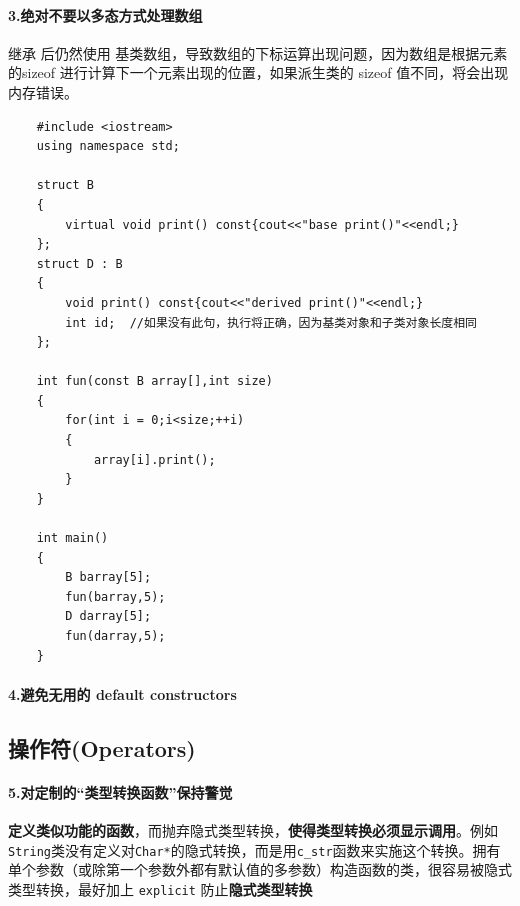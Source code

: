 \documentclass[UTF8,a4paper,12pt]{ctexbook}
\begin{document}
			\paragraph{3.绝对不要以多态方式处理数组} 继承 后仍然使用 基类数组，导致数组的下标运算出现问题，因为数组是根据元素的sizeof 进行计算下一个元素出现的位置，如果派生类的 sizeof 值不同，将会出现内存错误。
				\begin{lstlisting}
	#include <iostream>
	using namespace std;
	
	struct B
	{
		virtual void print() const{cout<<"base print()"<<endl;}
	};
	struct D : B
	{
		void print() const{cout<<"derived print()"<<endl;}
		int id;  //如果没有此句，执行将正确，因为基类对象和子类对象长度相同  
	};
	
	int fun(const B array[],int size)
	{
		for(int i = 0;i<size;++i)
		{
			array[i].print();
		}
	}
	
	int main()
	{
		B barray[5];
		fun(barray,5);
		D darray[5];
		fun(darray,5);
	}
				\end{lstlisting}
			\paragraph{4.避免无用的 default constructors}
			
		\subsection{操作符(Operators)}
			\paragraph{5.对定制的“类型转换函数”保持警觉}
				\textbf{定义类似功能的函数}，而抛弃隐式类型转换，\textbf{使得类型转换必须显示调用}。例如 \verb|String|类没有定义对\verb|Char*|的隐式转换，而是用\verb|c_str|函数来实施这个转换。拥有单个参数（或除第一个参数外都有默认值的多参数）构造函数的类，很容易被隐式类型转换，最好加上 \verb|explicit| 防止\textbf{隐式类型转换}
				
\end{document}
